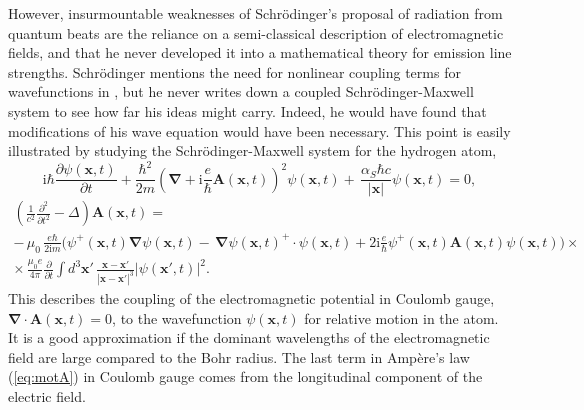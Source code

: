 \documentclass[final,3p,12pt]{elsarticle3}
\begin{document}
However, insurmountable weaknesses of Schr\"odinger's proposal of radiation from 
quantum beats are the reliance on a semi-classical description of electromagnetic
 fields, and that he never developed it into a mathematical theory for emission line 
strengths. Schr\"odinger mentions the need for nonlinear coupling terms for wavefunctions 
in \cite{erwin3}, but he never writes down a coupled Schr\"odinger-Maxwell system
to see how far his ideas might carry. Indeed, he would have found that modifications
of his wave equation would have been necessary. This point is easily illustrated
by studying the Schr\"odinger-Maxwell system for the hydrogen atom,
\begin{equation}
\!\!\!\mathrm{i}\hbar\frac{\partial\psi(\bm{x},t)}{\partial t}
+\frac{\hbar^2}{2m}\left(\bm{\nabla}+\mathrm{i}\frac{e}{\hbar}\bm{A}(\bm{x},t)\right)^2
\psi(\bm{x},t)
\label{eq:motpsi}
+\,\frac{\alpha_S\hbar c}{|\bm{x}|}\psi(\bm{x},t)=0,
\end{equation}
\begin{multline}
\left(\frac{1}{c^2}
\frac{\partial^2}{\partial t^2}-\Delta\right)
\bm{A}(\bm{x},t)= \\
-\,\mu_0\,\frac{e\hbar}{2\mathrm{i}m}
\Big(
\psi^+(\bm{x},t)\bm{\nabla}\psi(\bm{x},t)
-\,\bm{\nabla}\psi(\bm{x},t)^+\cdot
\psi(\bm{x},t)
+2\mathrm{i}\frac{e}{\hbar}\psi^+(\bm{x},t)
\bm{A}(\bm{x},t)\psi(\bm{x},t)\Big) \times \\
\times \,\frac{\mu_0 e}{4\pi}\frac{\partial}{\partial t}\int\!d^3\bm{x}'\,
\frac{\bm{x}-\bm{x}'}{|\bm{x}-\bm{x}'|^3}|\psi(\bm{x}',t)|^2.
\label{eq:motA}
\end{multline}
This describes the coupling of the electromagnetic potential in Coulomb gauge,
$\bm{\nabla}\cdot\bm{A}(\bm{x},t)=0$, to the wavefunction $\psi(\bm{x},t)$ for
relative motion in the atom. It is a good approximation if the dominant wavelengths 
of the electromagnetic field are large compared to the Bohr radius. The last term 
in Amp\`{e}re's law (\ref{eq:motA}) in Coulomb gauge comes from the longitudinal
component of the electric field.
\end{document}
